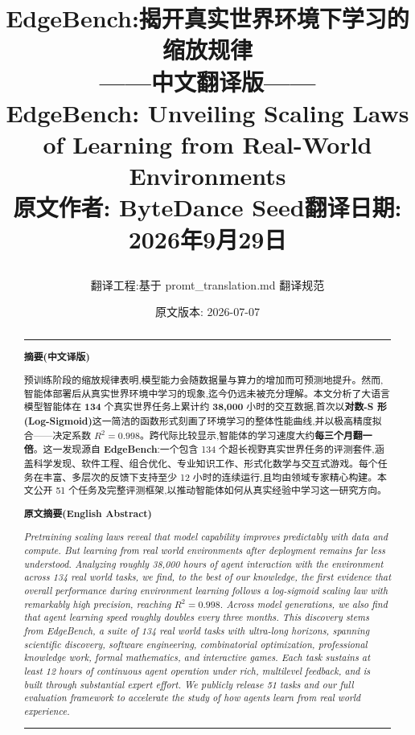 \documentclass[a4paper,11pt]{article}
\title{
    \vspace{-2em}
    \begin{minipage}{\textwidth}
        \centering
        {\LARGE\bfseries EdgeBench:揭开真实世界环境下学习的缩放规律}\\[0.5em]
        {\large ——中文翻译版——}\\[0.5em]
        {\normalsize EdgeBench: Unveiling Scaling Laws of Learning from Real-World Environments}\\[0.3em]
        {\small 原文作者: ByteDance Seed\quad 翻译日期: 2026年9月29日}
    \end{minipage}
}
\author{翻译工程:基于 promt\_translation.md 翻译规范}
\date{原文版本: 2026-07-07}
\theoremstyle{definition}
\begin{document}
\maketitle

\begin{abstract}
\noindent\rule{\textwidth}{0.5pt}
\begin{center}\textbf{摘要(中文译版)}\end{center}

预训练阶段的缩放规律表明,模型能力会随数据量与算力的增加而可预测地提升。然而,智能体部署后从真实世界环境中学习的现象,迄今仍远未被充分理解。本文分析了大语言模型智能体在 \textbf{134} 个真实世界任务上累计约 \textbf{38{,}000} 小时的交互数据,首次以\textbf{对数-S 形(Log-Sigmoid)}这一简洁的函数形式刻画了环境学习的整体性能曲线,并以极高精度拟合——决定系数 $R^2 = 0.998$。跨代际比较显示,智能体的学习速度大约\textbf{每三个月翻一倍}。这一发现源自 \textbf{EdgeBench}:一个包含 134 个超长视野真实世界任务的评测套件,涵盖科学发现、软件工程、组合优化、专业知识工作、形式化数学与交互式游戏。每个任务在丰富、多层次的反馈下支持至少 12 小时的连续运行,且均由领域专家精心构建。本文公开 51 个任务及完整评测框架,以推动智能体如何从真实经验中学习这一研究方向。

\begin{center}\textbf{原文摘要(English Abstract)}\end{center}

\textit{Pretraining scaling laws reveal that model capability improves predictably with data and compute. But learning from real world environments after deployment remains far less understood. Analyzing roughly 38,000 hours of agent interaction with the environment across 134 real world tasks, we find, to the best of our knowledge, the first evidence that overall performance during environment learning follows a log-sigmoid scaling law with remarkably high precision, reaching $R^2 = 0.998$. Across model generations, we also find that agent learning speed roughly doubles every three months. This discovery stems from EdgeBench, a suite of 134 real world tasks with ultra-long horizons, spanning scientific discovery, software engineering, combinatorial optimization, professional knowledge work, formal mathematics, and interactive games. Each task sustains at least 12 hours of continuous agent operation under rich, multilevel feedback, and is built through substantial expert effort. We publicly release 51 tasks and our full evaluation framework to accelerate the study of how agents learn from real world experience.}

\noindent\rule{\textwidth}{0.5pt}
\end{abstract}
\end{document}
